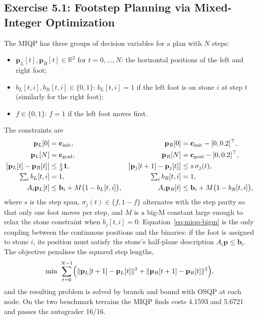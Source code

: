 \documentclass[11pt]{report}
\begin{document}
\subsection{Exercise 5.1: Footstep Planning via Mixed-Integer Optimization}

The MIQP has three groups of decision variables for a plan with $N$ steps:
\begin{itemize}[leftmargin=1.4em,itemsep=1pt]
  \item $\mathbf p_{L}[t],\mathbf p_{R}[t]\in\mathbb R^2$ for $t=0,\dots,N$:
        the horizontal positions of the left and right foot;
  \item $b_{L}[t,i],b_{R}[t,i]\in\{0,1\}$: $b_{L}[t,i]=1$ if the left foot is
        on stone $i$ at step $t$ (similarly for the right foot);
  \item $f\in\{0,1\}$: $f=1$ if the left foot moves first.
\end{itemize}
The constraints are
\begin{align}
  \mathbf p_{L}[0]&=\mathbf c_{\rm init}, &
  \mathbf p_{R}[0]&=\mathbf c_{\rm init}-[0,0.2]^\top, \nonumber\\
  \mathbf p_{L}[N]&=\mathbf c_{\rm goal}, &
  \mathbf p_{R}[N]&=\mathbf c_{\rm goal}-[0,0.2]^\top,
  \label{eq:miqp-endpoints}\\
  \bigl|\mathbf p_{L}[t]-\mathbf p_{R}[t]\bigr|&\le \tfrac{s}{2}\mathbf 1, &
  \bigl|\mathbf p_{j}[t+1]-\mathbf p_{j}[t]\bigr|&\le s\,\sigma_j(t),
  \label{eq:miqp-steps}\\
  \textstyle\sum_{i}b_{L}[t,i]&=1, &
  \textstyle\sum_{i}b_{R}[t,i]&=1,
  \label{eq:miqp-one-stone}\\
  A_i\mathbf p_{L}[t]&\le \mathbf b_i+M\bigl(1-b_{L}[t,i]\bigr), &
  A_i\mathbf p_{R}[t]&\le \mathbf b_i+M\bigl(1-b_{R}[t,i]\bigr),
  \label{eq:miqp-bigm}
\end{align}
where $s$ is the step span, $\sigma_j(t)\in\{f,1-f\}$ alternates with the step
parity so that only one foot moves per step, and $M$ is a big-M constant
large enough to relax the stone constraint when $b_{j}[t,i]=0$.
Equation~\eqref{eq:miqp-bigm} is the only coupling between the continuous
positions and the binaries: if the foot is assigned to stone $i$, its position
must satisfy the stone's half-plane description $A_i\mathbf p\le\mathbf b_i$.
The objective penalises the squared step lengths,
\[
\min\ \sum_{t=0}^{N-1}\Bigl(\|\mathbf p_{L}[t+1]-\mathbf p_{L}[t]\|^2
+\|\mathbf p_{R}[t+1]-\mathbf p_{R}[t]\|^2\Bigr),
\]
and the resulting problem is solved by branch and bound with OSQP at each node.
On the two benchmark terrains the MIQP finds costs 4.1593 and 5.6721 and passes
the autograder 16/16.
\end{document}
